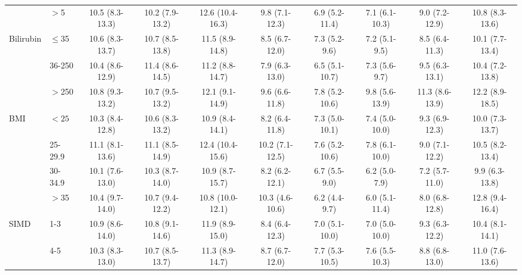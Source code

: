 \begin{sidewaystable}[p]
\begin{tabular}{|l l | cc cc cc cc |}
		                    & $>$5      & 10.5 (8.3-13.3) & 10.2 (7.9-13.2) & 12.6 (10.4-16.3) & 9.8 (7.1-12.3)  & 6.9 (5.2-11.4) & 7.1 (6.1-10.3) & 9.0 (7.2-12.9)  & 10.8 (8.3-13.6) \\
		Bilirubin           & $\leq$35  & 10.6 (8.3-13.7) & 10.7 (8.5-13.8) & 11.5 (8.9-14.8)  & 8.5 (6.7-12.0)  & 7.3 (5.2-9.6)  & 7.2 (5.1-9.5)  & 8.5 (6.4-11.3)  & 10.1 (7.7-13.4) \\
		                    & 36-250    & 10.4 (8.6-12.9) & 11.4 (8.6-14.5) & 11.2 (8.8-14.7)  & 7.9 (6.3-13.0)  & 6.5 (5.1-10.7) & 7.3 (5.6-9.7)  & 9.5 (6.3-13.1)  & 10.4 (7.2-13.8) \\
		                    & $>$250    & 10.8 (9.3-13.2) & 10.7 (9.5-13.2) & 12.1 (9.1-14.9)  & 9.6 (6.6-11.8)  & 7.8 (5.2-10.6) & 9.8 (5.6-13.9) & 11.3 (8.6-13.9) & 12.2 (8.9-18.5) \\
		BMI                 & $<25$     & 10.3 (8.4-12.8) & 10.6 (8.3-13.2) & 10.9 (8.4-14.1)  & 8.2 (6.4-11.8)  & 7.3 (5.0-10.1) & 7.4 (5.0-10.0) & 9.3 (6.9-12.3)  & 10.0 (7.3-13.7) \\
		                    & 25-29.9   & 11.1 (8.1-13.6) & 11.1 (8.5-14.9) & 12.4 (10.4-15.6) & 10.2 (7.1-12.5) & 7.6 (5.2-10.6) & 7.8 (6.1-10.0) & 9.0 (7.1-12.2)  & 10.5 (8.2-13.4) \\
		                    & 30-34.9   & 10.1 (7.6-13.0) & 10.3 (8.7-14.0) & 10.9 (8.7-15.7)  & 8.2 (6.2-12.1)  & 6.7 (5.5-9.0)  & 6.2 (5.0-7.9)  & 7.2 (5.7-11.0)  & 9.9 (6.3-13.8)  \\
		                    & $>$35     & 10.4 (9.7-14.0) & 10.7 (9.4-12.2) & 10.8 (10.0-12.1) & 10.3 (4.6-10.6) & 6.2 (4.4-9.7)  & 6.0 (5.1-11.4) & 8.0 (6.8-12.8)  & 12.8 (9.4-16.4) \\
		SIMD                & 1-3       & 10.9 (8.6-14.0) & 10.8 (9.1-14.6) & 11.9 (8.9-15.0)  & 8.4 (6.4-12.3)  & 7.0 (5.1-10.0) & 7.0 (5.0-10.0) & 9.3 (6.3-12.2)  & 10.4 (8.1-14.1) \\
		                    & 4-5       & 10.3 (8.3-13.0) & 10.7 (8.5-13.7) & 11.3 (8.9-14.7)  & 8.7 (6.7-12.0)  & 7.7 (5.3-10.5) & 7.6 (5.5-10.3) & 8.8 (6.8-13.0)  & 11.0 (7.6-13.6) \\

\end{tabular}
\end{sidewaystable}
